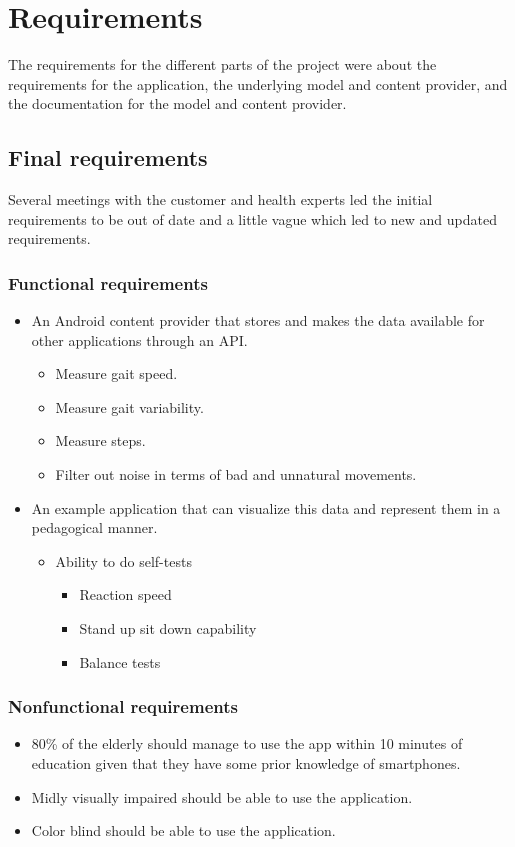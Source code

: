 \chapter{Requirements}
The requirements for the different parts of the project were about the requirements for the application, the underlying model and content provider, and the documentation for the model and content provider. 

\section{Final requirements}
Several meetings with the customer and health experts led the initial requirements to be out of date and a little vague which led to new and updated requirements.

\subsection{Functional requirements}
\begin{itemize}
\item An Android content provider that stores and makes the data available for other applications through an API.
\begin{itemize}
\item Measure gait speed.
\item Measure gait variability.
\item Measure steps.
\item Filter out noise in terms of bad and unnatural movements.
\end{itemize}
\item An example application that can visualize this data and represent them in a pedagogical manner.
\begin{itemize}
\item Ability to do self-tests
\begin{itemize}
\item Reaction speed
\item Stand up sit down capability
\item Balance tests
\end{itemize}
\end{itemize}
\end{itemize}	

\subsection{Nonfunctional requirements}
\begin{itemize}
\item 80\% of the elderly should manage to use the app within 10 minutes of education given that they have some prior knowledge of smartphones.
\item Midly visually impaired should be able to use the application.
\item Color blind should be able to use the application.
\end{itemize}	


